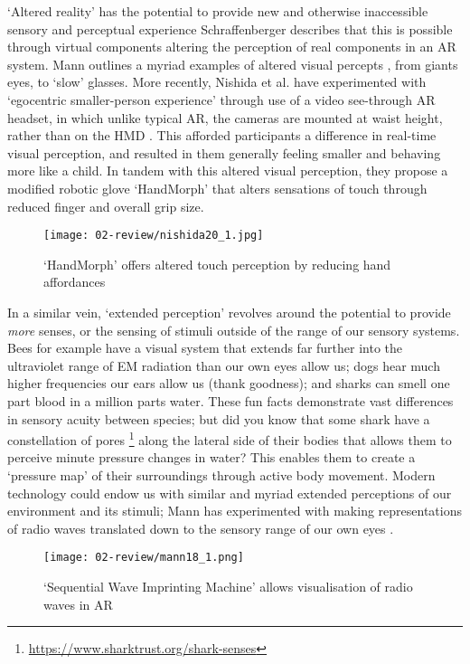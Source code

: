 `Altered reality' has the potential to provide new and otherwise inaccessible sensory and perceptual experience Schraffenberger describes that this is possible through virtual components altering the perception of real components in an AR system. Mann outlines a myriad examples of altered visual percepts \citeyearpar{mann1994}, from giants eyes, to `slow' glasses. More recently, Nishida et al. have experimented with `egocentric smaller-person experience' through use of a video see-through AR headset, in which unlike typical AR, the cameras are mounted at waist height, rather than on the HMD \citeyearpar{nishida2019}. This afforded participants a difference in real-time visual perception, and resulted in them generally feeling smaller and behaving more like a child. In tandem with this altered visual perception, they propose a modified robotic glove `HandMorph' \citeyearpar{nishida2020} that alters sensations of touch through reduced finger and overall grip size. 

\begin{wrapfigure}{l}{0.45\textwidth}
    \begin{minipage}{0.95\linewidth}
        \texttt{[image: 02-review/nishida20\_1.jpg]}
        \captionsetup{justification=justified}
        \caption{`HandMorph' offers altered touch perception by reducing hand affordances \citep[in][]{nishida2020}}\label{fig: handmorph}
    \end{minipage}
    \hfill
\end{wrapfigure}

In a similar vein, `extended perception' revolves around the potential to provide \textit{more} senses, or the sensing of stimuli outside of the range of our sensory systems. Bees for example have a visual system that extends far further into the ultraviolet range of EM radiation than our own eyes allow us; dogs hear much higher frequencies our ears allow us (thank goodness); and sharks can smell one part blood in a million parts water. These fun facts demonstrate vast differences in sensory acuity between species; but did you know that some shark have a constellation of pores \footnote{\url{https://www.sharktrust.org/shark-senses}} along the lateral side of their bodies that allows them to perceive minute pressure changes in water? This enables them to create a `pressure map' of their surroundings through active body movement. Modern technology could endow us with similar and myriad extended perceptions of our environment and its stimuli; Mann has experimented with making representations of radio waves translated down to the sensory range of our own eyes \citeyearpar{mann2018a}.
\begin{wrapfigure}{R}{0.45\textwidth}
    \raggedleft
    \texttt{[image: 02-review/mann18\_1.png]}
    \captionsetup{justification=raggedleft}
    \caption{`Sequential Wave Imprinting Machine' allows visualisation of radio waves in AR \citep[in][]{mann2018a}}\label{fig: mann_swim}
\end{wrapfigure}


